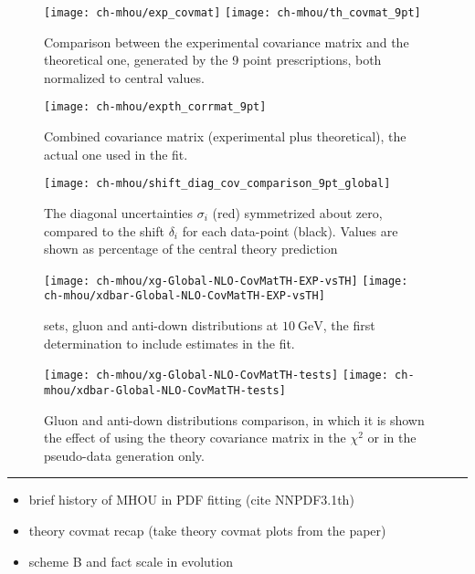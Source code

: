 
\begin{figure}
	\centering
	\texttt{[image: ch-mhou/exp\_covmat]}
	\texttt{[image: ch-mhou/th\_covmat\_9pt]}
	\caption{
		Comparison between the experimental covariance matrix and the
		theoretical one, generated by the 9 point prescriptions, both
		normalized to central values.
	}
	\label{fig:pine/covmats}
\end{figure}

\begin{figure}
	\centering
	\texttt{[image: ch-mhou/expth\_corrmat\_9pt]}
	\caption{
		Combined covariance matrix (experimental plus theoretical), the actual
		one used in the  fit.
	}
	\label{fig:pine/combined-covmat}
\end{figure}

\begin{figure}
	\centering
	\texttt{[image: ch-mhou/shift\_diag\_cov\_comparison\_9pt\_global]}
	\caption{
		The diagonal uncertainties $\sigma_i$ (red) symmetrized about zero,
		compared to the shift $\delta_i$ for each data-point (black).
		Values are shown as percentage of the central theory prediction
	}
	\label{fig:pine/scvar-shifts}
\end{figure}

\begin{figure}
	\centering
	\texttt{[image: ch-mhou/xg-Global-NLO-CovMatTH-EXP-vsTH]}
	\texttt{[image: ch-mhou/xdbar-Global-NLO-CovMatTH-EXP-vsTH]}
	\caption{
		 \nlo sets, gluon and anti-down distributions at
		$\SI{10}{\giga\electronvolt}$, the first \pdf determination to include
		\mhou estimates in the fit.
	}
	\label{fig:pine/3.1th}
\end{figure}

\begin{figure}
	\centering
	\texttt{[image: ch-mhou/xg-Global-NLO-CovMatTH-tests]}
	\texttt{[image: ch-mhou/xdbar-Global-NLO-CovMatTH-tests]}
	\caption{
		Gluon and anti-down distributions comparison, in which it is shown the
		effect of using the theory covariance matrix in the $\chi^2$ or in the
		pseudo-data generation only.
	}
	\label{fig:pine/3.1th-tests}
\end{figure}


\vspace*{20pt}
\noindent
\rule{\hsize}{1pt}

\begin{itemize}
	\item brief history of MHOU in PDF fitting (cite NNPDF3.1th)
	\item theory covmat recap (take theory covmat plots from the paper)
	\item scheme B and fact scale in evolution
\end{itemize}
